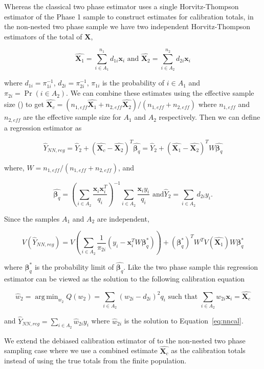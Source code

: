 \documentclass[12pt]{article}
\DeclareMathOperator*{\argmin}{arg\,min}
\renewcommand{\bf}[1]{\mathbf{#1}}
\begin{document}
Whereas the classical two phase estimator uses a single Horvitz-Thompson
estimator of the Phase 1 sample to construct estimates for calibration totals,
in the non-nested two phase sample we have two independent Horvitz-Thompson
estimators of the total of $\bf X$,

$$\hat{\bf X_1} = \sum_{i \in A_1}^{n_1} d_{1i} \bf x_i \text{ and } 
\hat{\bf X_2} = \sum_{i \in A_2}^{n_2} d_{2i} \bf x_i $$

where $d_{1i} = \pi_{1i}^{-1}$, $d_{2i} = \pi_{2i}^{-1}$, $\pi_{1i}$ is the
probability of $i \in A_1$ and $\pi_{2i} = \Pr(i \in A_2)$. 
We can combine these estimates using the effective sample size 
(\cite{kish1965survey}) to get
$\hat{\bf X_c} = (n_{1, eff} \hat{\bf X_1} + n_{2, eff}\hat{\bf X_2}) / 
(n_{1, eff} + n_{2, eff})$ where $n_{1, eff}$ and $n_{2, eff}$ are the effective
sample size for $A_1$ and $A_2$ respectively. Then we can define a regression
estimator as

$$
\hat Y_{NN, reg} = \hat Y_2 + (\hat{\bf X_c} - \hat{\bf X_2})^T \hat{\bm \beta_q} = 
\hat Y_2 + (\hat{\bf X_1} - \hat{\bf X_2})^T W\hat{\bm \beta_q}
$$

where, $W = n_{1, eff} / (n_{1, eff} + n_{2, eff})$, and

$$\hat{\bm \beta_q} = \left(\sum_{i \in A_2} 
\frac{\bf x_i \bf x_i^T}{q_i}\right)^{-1} 
\sum_{i \in A_2} \frac{\bf x_i y_i}{q_i} \text{ and
}\hat Y_2 = \sum_{i \in A_2} d_{2i} y_i. $$

Since the samples $A_1$ and $A_2$ are independent, 

$$V(\hat Y_{NN, reg}) = V\left(\sum_{i \in A_2} \frac{1}{\pi_{2i}}(y_i -
\bf x_i^TW\bm \beta^*_q)\right) + (\bm \beta^*_q)^T W^T V(\hat{\bf X_1}) W \bm \beta_q^*$$

where $\bm \beta_q^*$ is the probability limit of $\hat{\bm \beta_q}$. Like the two phase
sample this regression estimator can be viewed as the solution to the following
calibration equation 

\begin{equation}\label{eq:nncal}
  \hat w_2 = \argmin_{w_2} Q(w_2) = \sum_{i \in A_2} (w_{2i} - d_{2i})^2 q_i 
  \text{ such that } \sum_{i \in A_2} w_{2i} \bf x_i = \hat{\bf X_c}
\end{equation}

and $\hat Y_{NN, reg} = \sum_{i \in A_2} \hat w_{2i} y_i$ where $\hat
w_{2i}$ is the solution to Equation~\ref{eq:nncal}.

We extend the debiased calibration estimator of \cite{kwon2024debiased} to the
non-nested two phase sampling case where we use a combined estimate 
$\hat{\bm X_c}$ as the calibration totals instead of using the true totals from
the finite population.
\end{document}
